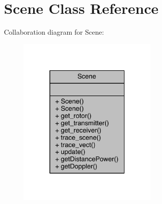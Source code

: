 \hypertarget{class_scene}{}\section{Scene Class Reference}
\label{class_scene}


Collaboration diagram for Scene\+:
\nopagebreak
\begin{figure}[H]
\begin{center}
\leavevmode
\includegraphics[width=193pt]{doxygen/latex/class_scene__coll__graph}
\end{center}
\end{figure}
